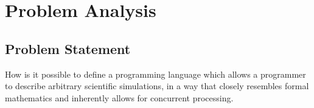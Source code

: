 \section{Problem Analysis}
\subsection{Problem Statement}
How is it possible to define a programming language which allows a programmer to describe arbitrary scientific simulations, in a way that closely resembles formal mathematics and inherently allows for concurrent processing.
